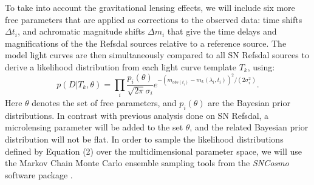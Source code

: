 To take into account the gravitational lensing effects, we will include six more free parameters that are
applied as corrections to the observed data: time shifts $\Delta t_i$, and achromatic magnitude
shifts $\Delta m_i$ that give the time delays and magnifications of the the Refsdal sources relative to
a reference source. The model light curves are then simultaneously compared to all SN Refsdal sources
to derive a likelihood distribution from each light curve template $T_k$, using:
\begin{equation}
p(D|T_k,\theta)=\prod\limits_i\frac{p_i(\theta)}{\sqrt{2\pi}\sigma_i}e^{-(m_{obs(t_i)}-m_k(\lambda_i,t_i))^2
/(2\sigma^2_i)}.
\end{equation}
Here $\theta$ denotes the set of free parameters, and $p_i(\theta)$ are the Bayesian prior distributions. 
In contrast with previous analysis done on SN Refsdal, a microlensing parameter will be added to the set 
$\theta$, and the related Bayesian prior distribution will not be flat. In order to sample the likelihood distributions 
defined by Equation (2) over the multidimensional parameter space, we will use the Markov Chain Monte Carlo
ensemble sampling tools from the \textit{SNCosmo} software package \citep{Barbary:2014}.


